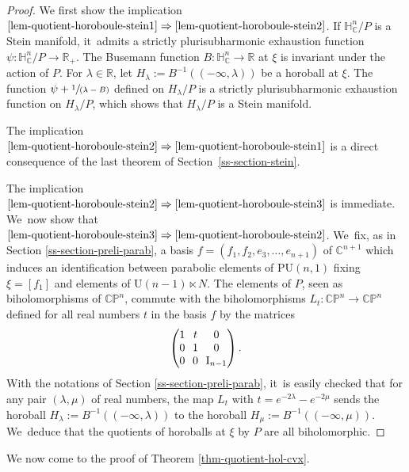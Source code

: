 \documentclass[JEP,XML,SOM,Unicode,NoEqCountersInSection,published]{cedram}
\newcommand{\spfrac}[2]{\sfrac{#1}{(#2)}}
\theoremstyle{definition}
\newcommand{\C}{\mathbb{C}}
\newcommand{\R}{\mathbb{R}}
\newcommand{\HNC}{\mathbb{H}^{n}_{\C}}
\newcommand{\PU}{\mathrm{PU}}
\newcommand{\PNC}{\C \mathbb{P}^{n}}
\def\C{\mathbb{C}}
\newcommand{\HNC}{\mathbb{H}^{n}_{\C}}
\newcommand{\PU}{\mathrm{PU}}
\begin{document}
\begin{proof}
We first show the implication $\eqref{lem-quotient-horoboule-stein1}\Rightarrow\eqref{lem-quotient-horoboule-stein2}$. If $\HNC/P$ is a Stein manifold, it~admits a strictly plurisubharmonic exhaustion function $\psi:\HNC/P\to \R_+$. The Busemann function $B:\HNC\to \R$ at $\xi$ is invariant under the action of $P$. For $\lambda\in\mathbb{R}$, let $H_{\lambda}:= B^{-1}((-\infty,\lambda))$ be a horoball at $\xi$. The function $\psi + \spfrac{1}{\lambda - B}$ defined on $H_{\lambda}/P$ is a strictly plurisubharmonic exhaustion function on $H_{\lambda}/P$, which shows that $H_{\lambda}/P$ is a Stein manifold.

The implication $\eqref{lem-quotient-horoboule-stein2}\Rightarrow\eqref{lem-quotient-horoboule-stein1}$ is a direct consequence of the last theorem of Section~\ref{ss-section-stein}.

The implication $\eqref{lem-quotient-horoboule-stein2}\Rightarrow\eqref{lem-quotient-horoboule-stein3}$ is immediate. We~now show that $\eqref{lem-quotient-horoboule-stein3}\Rightarrow\eqref{lem-quotient-horoboule-stein2}$. We~fix, as in Section \ref{ss-section-preli-parab}, a basis $f=(f_1,f_2,e_3,\dots,e_{n+1})$ of $\C^{n+1}$ which induces an identification between parabolic elements of $\PU(n,1)$ fixing $\xi=[f_1]$ and elements of $\mathrm{U}(n-1)\ltimes N$. The elements of $P$, seen as biholomorphisms of $\PNC$, commute with the biholomorphisms $L_t:\PNC\to \PNC$ defined for all real numbers $t$ in the basis $f$ by the matrices
\begin{equation*}
\arraycolsep3.5pt
\begin{pmatrix}
1 &t &0\\
0 &1 &0\\
0 &0 &\mathrm{I}_{n-1}
\end{pmatrix}.
\end{equation*}
With the notations of Section \ref{ss-section-preli-parab}, it~is easily checked that for any pair $(\lambda,\mu)$ of real numbers, the map $L_t$ with $t=e^{-2\lambda}-e^{-2\mu}$ sends the horoball $H_{\lambda}:=B^{-1}((-\infty,\lambda))$ to the horoball $H_{\mu}:=B^{-1}((-\infty,\mu))$. We~deduce that the quotients of horoballs at $\xi$ by $P$ are all biholomorphic.
\end{proof}

We now come to the proof of Theorem \ref{thm-quotient-hol-cvx}.
\end{document}
